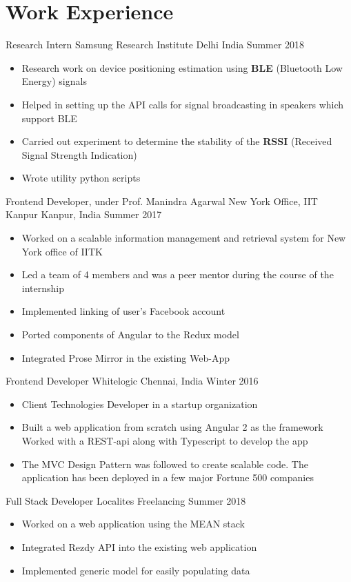 \section*{\sc Work Experience}
\vspace{-2mm}
\hrulefill
\vspace{2mm}

\cventry
{Research Intern}
{Samsung Research Institute}
{Delhi India}
{Summer 2018}
{
  \begin{itemize}
    \item Research work on device positioning estimation using \textbf{BLE} (Bluetooth
        Low Energy) signals
    \item Helped in setting up the API calls for signal broadcasting in speakers
      which support BLE
    \item Carried out experiment to determine the stability of the \textbf{RSSI}
      (Received Signal Strength Indication)
    \item Wrote utility python scripts 
    \end{itemize}
}

\cventry
{Frontend Developer, under Prof. Manindra Agarwal}
{New York Office, IIT Kanpur}
{Kanpur, India}
{Summer 2017}
{
  \begin{itemize}
  \item Worked on a scalable information management and retrieval system for New York office of IITK
  \item Led a team of 4 members and was a peer mentor during the course of the internship
  \item Implemented linking of user's Facebook account
  \item Ported components of Angular to the Redux model
  \item Integrated Prose Mirror in the existing Web-App
  \end{itemize}
}

\cventry
{Frontend Developer}
{Whitelogic}
{Chennai, India}
{Winter 2016}
{
  \begin{itemize}
  \item Client Technologies Developer in a startup organization
  \item Built a web application from scratch using Angular 2 as the framework
   Worked with a REST-api along with Typescript to develop the app
  \item The MVC Design Pattern was followed to create scalable code. The application
    has been deployed in a few major Fortune 500 companies
  \end{itemize}
}

\cventry
{Full Stack Developer}
{Localites}
{Freelancing}
{Summer 2018}
{
  \begin{itemize}
    \item Worked on a web application using the MEAN stack
    \item Integrated Rezdy API into the existing web application
    \item Implemented generic model for easily populating data
  \end{itemize}
}



